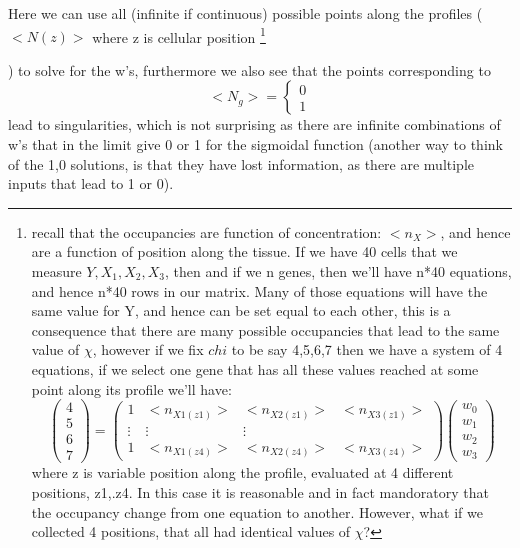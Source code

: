 Here we can use all (infinite if continuous) possible points along the profiles ($<N(z)>$ where z is cellular position \footnote[1]{

recall that the occupancies are function of concentration: $<n_X> $, and hence are a function of position along the tissue.  If we have 40 cells that we measure $Y, X_1,X_2,X_3$, then and if we n genes, then we'll have n*40 equations, and hence n*40 rows in our matrix.  Many of those equations will have the same value for Y, and hence can be set equal to each other, this is a consequence that there are many possible occupancies that lead to the same value of $\chi$, however if we fix $chi$ to be say 4,5,6,7 then we have a system of 4 equations, if we select one gene that has all these values reached at some point along its profile we'll have:
\[
\begin{pmatrix} 4 \\ 5 \\ 6 \\ 7\end{pmatrix}=
 \begin{pmatrix}
   1& <n_{X1(z1)}> & <n_{X2(z1)}> & <n_{X3(z1)}>  \\
   \vdots & \vdots & \vdots \\
1& <n_{X1(z4)}> & <n_{X2(z4)}> & <n_{X3(z4)}>
 \end{pmatrix} \begin{pmatrix} w_0 \\ w_1 \\ w_2 \\ w_3 \end{pmatrix}
\]
where z is variable position along the profile, evaluated at 4 different positions, z1,.z4.  In this case it is reasonable and in fact mandoratory that the occupancy change from one equation to another.  However, what if we collected 4 positions, that all had identical values of $\chi$?}

) to solve for the w's, furthermore we also see that the points corresponding to $$<N_{g}> =\begin{cases}0  \\ 1 \end{cases}$$ lead to singularities, which is not surprising as there are infinite combinations of w's that in the limit give 0 or 1 for the sigmoidal function (another way to think of the 1,0 solutions, is that they have lost information, as there are multiple inputs that lead to 1 or 0).

\par

